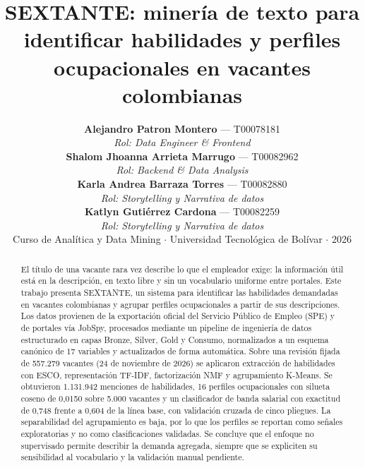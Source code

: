 \documentclass[journal]{IEEEtran}
\begin{document}
\title{SEXTANTE: minería de texto para identificar habilidades y perfiles ocupacionales en vacantes colombianas}

\author{\textbf{Alejandro Patron Montero} --- T00078181\\
\textit{Rol: Data Engineer \& Frontend}\\[3pt]
\textbf{Shalom Jhoanna Arrieta Marrugo} --- T00082962\\
\textit{Rol: Backend \& Data Analysis}\\[3pt]
\textbf{Karla Andrea Barraza Torres} --- T00082880\\
\textit{Rol: Storytelling y Narrativa de datos}\\[3pt]
\textbf{Katlyn Gutiérrez Cardona} --- T00082259\\
\textit{Rol: Storytelling y Narrativa de datos}\\[5pt]
Curso de Analítica y Data Mining $\cdot$ Universidad Tecnológica de Bolívar $\cdot$ 2026}


\maketitle

\begin{abstract}
El título de una vacante rara vez describe lo que el empleador exige: la información útil está en la descripción, en texto libre y sin un vocabulario uniforme entre portales. Este trabajo presenta SEXTANTE, un sistema para identificar las habilidades demandadas en vacantes colombianas y agrupar perfiles ocupacionales a partir de sus descripciones. Los datos provienen de la exportación oficial del Servicio Público de Empleo (SPE) y de portales vía JobSpy, procesados mediante un pipeline de ingeniería de datos estructurado en capas Bronze, Silver, Gold y Consumo, normalizados a un esquema canónico de 17 variables y actualizados de forma automática. Sobre una revisión fijada de 557.279 vacantes (24 de noviembre de 2026) se aplicaron extracción de habilidades con ESCO, representación TF-IDF, factorización NMF y agrupamiento K-Means. Se obtuvieron 1.131.942 menciones de habilidades, 16 perfiles ocupacionales con silueta coseno de 0,0150 sobre 5.000 vacantes y un clasificador de banda salarial con exactitud de 0,748 frente a 0,604 de la línea base, con validación cruzada de cinco pliegues. La separabilidad del agrupamiento es baja, por lo que los perfiles se reportan como señales exploratorias y no como clasificaciones validadas. Se concluye que el enfoque no supervisado permite describir la demanda agregada, siempre que se expliciten su sensibilidad al vocabulario y la validación manual pendiente.
\end{abstract}
\end{document}
